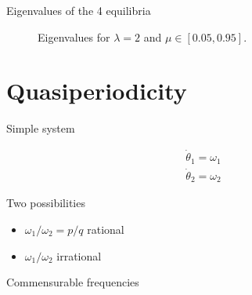 \documentclass{beamer}
\begin{document}
\begin{frame}{Eigenvalues of the 4 equilibria}
\begin{figure}
    \centering
    
    \begin{small}
    \caption{Eigenvalues for $\lambda=2$ and $\mu\in [0.05, 0.95]$.}
    \end{small}
\end{figure}
\end{frame}


\section{Quasiperiodicity}

\begin{frame}{Simple system}

\begin{example}
\begin{align*}
    \dot \theta_1 = \omega_1\\
    \dot \theta_2 = \omega_2
\end{align*}
\end{example}

\vspace{7mm}
Two possibilities
\begin{itemize}
    \item $\omega_1/\omega_2=p/q$ rational
    \item $\omega_1/\omega_2$ irrational
\end{itemize}
\end{frame}

\begin{frame}{Commensurable frequencies}
    \centering
\end{frame}
\end{document}

